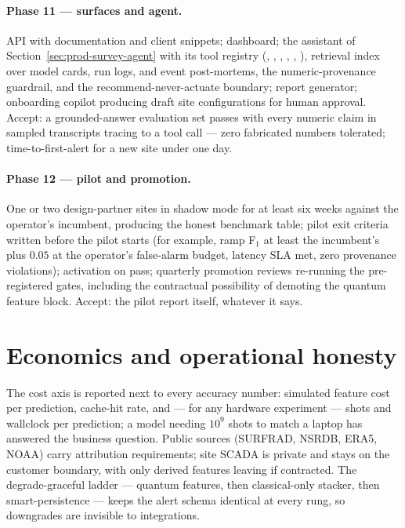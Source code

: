 \paragraph{Phase 11 --- surfaces and agent.} API with documentation and
client snippets; dashboard; the assistant of
Section~\ref{sec:prod-survey-agent} with its tool registry
(, ,
, ,
, ), retrieval index
over model cards, run logs, and event post-mortems, the numeric-provenance
guardrail, and the recommend-never-actuate boundary; report generator;
onboarding copilot producing draft site configurations for human approval.
Accept: a grounded-answer evaluation set passes with every numeric claim in
sampled transcripts tracing to a tool call --- zero fabricated numbers
tolerated; time-to-first-alert for a new site under one day.

\paragraph{Phase 12 --- pilot and promotion.} One or two design-partner
sites in shadow mode for at least six weeks against the operator's
incumbent, producing the honest benchmark table; pilot exit criteria
written before the pilot starts (for example, ramp F$_1$ at least the
incumbent's plus $0.05$ at the operator's false-alarm budget, latency SLA
met, zero provenance violations); activation on pass; quarterly promotion
reviews re-running the pre-registered gates, including the contractual
possibility of demoting the quantum feature block. Accept: the pilot
report itself, whatever it says.

\section{Economics and operational honesty}
\label{sec:prod-econ}

The cost axis is reported next to every accuracy number: simulated feature
cost per prediction, cache-hit rate, and --- for any hardware experiment
--- shots and wallclock per prediction; a model needing $10^9$ shots to
match a laptop has answered the business question. Public sources
(SURFRAD, NSRDB, ERA5, NOAA) carry attribution requirements; site SCADA is
private and stays on the customer boundary, with only derived features
leaving if contracted. The degrade-graceful ladder --- quantum features,
then classical-only stacker, then smart-persistence --- keeps the alert
schema identical at every rung, so downgrades are invisible to
integrations.

